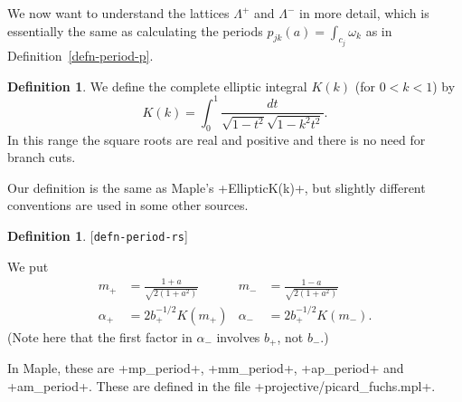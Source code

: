 \documentclass[reqno]{amsart}
\newcommand{\lbl}[1]{\label{#1}\textup{[\texttt{#1}]}\par}
\newcommand{\lbl}{\label}
\newcommand{\Lm}        {\Lambda}
\newcommand{\al}        {\alpha}
\newcommand{\om}        {\omega}
\renewcommand{\:}{\colon}
\theoremstyle{definition}
\newtheorem{remark}[theorem]{Remark}
\newtheorem{definition}[theorem]{Definition}
\begin{document}
We now want to understand the lattices $\Lm^+$ and $\Lm^-$ in more
detail, which is essentially the same as calculating the periods
$p_{jk}(a)=\int_{c_j}\om_k$ as in Definition~\ref{defn-period-p}.

\begin{definition}
 We define the complete elliptic integral $K(k)$ (for $0<k<1$) by
 \[ K(k) = \int_0^1 \frac{dt}{\sqrt{1-t^2}\sqrt{1-k^2t^2}}. \]
 In this range the square roots are real and positive and there is no
 need for branch cuts.
\end{definition}

Our definition is the same as Maple's \mcode+EllipticK(k)+, but
slightly different conventions are used in some other sources.

\begin{definition}\lbl{defn-period-rs}
 We put
 \begin{align*}
  m_+ &= \frac{1 + a}{\sqrt{2(1+a^2)}} &
  m_- &= \frac{1 - a}{\sqrt{2(1+a^2)}} \\
  \al_+ &= 2b_+^{-1/2} K(m_+) &
  \al_- &= 2b_+^{-1/2} K(m_-).
 \end{align*}
 (Note here that the first factor in $\al_-$ involves $b_+$, not $b_-$.)
\end{definition}
In Maple, these are \mcode+mp_period+, \mcode+mm_period+,
\mcode+ap_period+ and \mcode+am_period+.  These are defined in the file
\fname+projective/picard_fuchs.mpl+.
%
\end{document}
